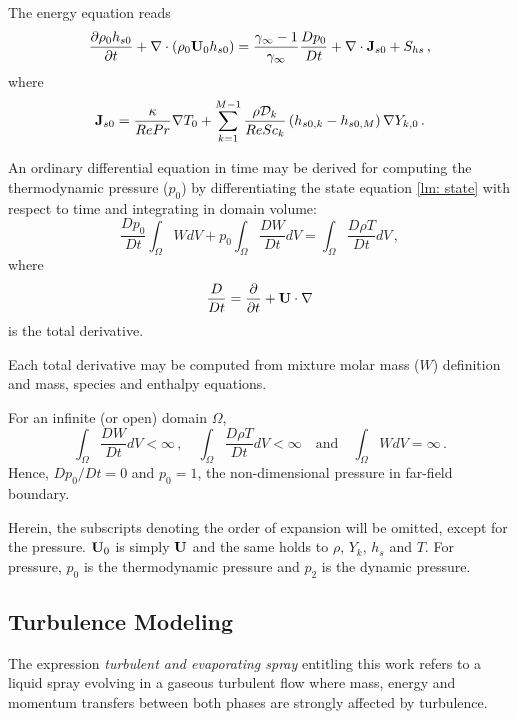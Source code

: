 The energy equation reads
\begin{equation}\label{lm: enthalpy}
\frac{\partial \rho_0 h_{s0}}{\partial t} +  \nabla \cdot \left(\rho_0 \bv{U}_0
h_{s0} \right) = \frac{\gamma_{\infty} -1}{\gamma_{\infty}}\frac{Dp_0}{Dt} + \nabla \cdot
\bv{J}_{s0} + S_{hs}\, ,
\end{equation} where 
\begin{equation}
\mathbf{J}_{s0} =  \frac{\kappa}{Re Pr} \nabla T_0 + \sum_{k=1}^{M-1}
\frac{\rho\mathcal{D}_k}{Re Sc_k} \left( h_{s0,k} -h_{s0,M} \right) \nabla
Y_{k,0} \, . 
\end{equation}

An ordinary differential equation in time may be derived for computing the thermodynamic pressure ($p_0$) by differentiating the state equation \eqref{lm: state} with respect to time and integrating in domain volume:
\begin{equation}\label{lm: dstate}
 \frac{Dp_0}{Dt}\int_{\Omega}W dV + p_0 \int_{\Omega}\frac{DW}{Dt} dV=\int_{\Omega} \frac{D\rho T}{Dt} dV\, ,
\end{equation}
where 
\begin{equation}
\frac{D}{Dt} = \frac{\partial}{\partial t}+\mathbf{U}\cdot\nabla
\end{equation}
is the total derivative.

Each total derivative may be computed from mixture molar mass ($W$) definition and mass, species and enthalpy equations. 

For an infinite (or open) domain $\Omega$, 
\begin{equation}
\int_{\Omega}\frac{DW}{Dt} dV < \infty \, , \quad \int_{\Omega} \frac{D\rho T}{Dt} dV < \infty \quad \text{and} \quad \int_{\Omega}W dV = \infty \, .
\end{equation}
 Hence, $Dp_0/Dt = 0$ and $p_0 = 1$, the non-dimensional pressure in far-field boundary.

Herein, the subscripts denoting the order of expansion will be omitted, except
for the pressure. $\mathbf{U}_0$ is simply $\mathbf{U}$ and the same holds to $\rho$,
$Y_k$, $h_s$ and $T$. For pressure, $p_0$ is the thermodynamic pressure and
$p_2$ is the dynamic pressure.

\subsection{Turbulence Modeling}

The expression \textit{turbulent and evaporating spray} entitling this work
refers to a liquid spray evolving in a gaseous turbulent flow where mass, energy
and momentum transfers between both phases are strongly affected by turbulence. 

